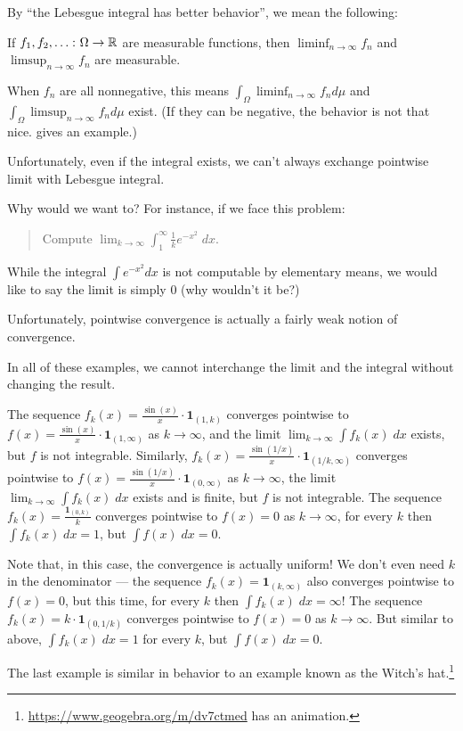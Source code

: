 By ``the Lebesgue integral has better behavior'', we mean the following:
\begin{proposition}
	If $f_1, f_2, \dots \colon \Omega \to \mathbb R$ are measurable functions,
	then $\liminf_{n \to \infty} f_n$ and $\limsup_{n \to \infty} f_n$ are measurable.
\end{proposition}
When $f_n$ are all nonnegative, this means
$\int_\Omega \liminf_{n \to \infty} f_n d\mu$ and $\int_\Omega \limsup_{n \to \infty} f_n d\mu$ exist.
(If they can be negative, the behavior is not that nice.  gives an example.)

Unfortunately, even if the integral exists, we can't always exchange pointwise limit with Lebesgue
integral.

Why would we want to? For instance, if we face this problem:
\begin{quote}
	Compute $\lim_{k \to \infty} \int_1^\infty \frac{1}{k} e^{-x^2} \; dx$.
\end{quote}
While the integral $\int e^{-x^2} dx$ is not computable by elementary means,
we would like to say the limit is simply $0$ (why wouldn't it be?)

Unfortunately, pointwise convergence is actually a fairly weak notion of convergence.

\begin{example}
	\label{ex:failure_interchange_lim_int}
	In all of these examples, we cannot interchange the limit and the integral
	without changing the result.
	\begin{itemize}
		\ii The sequence $f_k(x) = \frac{\sin(x)}{x} \cdot \mathbf{1}_{(1, k)}$ converges pointwise to
		$f(x) = \frac{\sin(x)}{x} \cdot \mathbf{1}_{(1, \infty)}$ as $k \to \infty$,
		and the limit $\lim_{k \to \infty} \int f_k(x) \; dx$ exists, but $f$ is not integrable.
		\ii Similarly, $f_k(x) = \frac{\sin(1/x)}{x} \cdot \mathbf{1}_{(1/k, \infty)}$
		converges pointwise to $f(x) = \frac{\sin(1/x)}{x} \cdot \mathbf{1}_{(0, \infty)}$
		as $k \to \infty$,
		the limit $\lim_{k \to \infty} \int f_k(x) \; dx$ exists and is finite,
		but $f$ is not integrable.
		\ii The sequence $f_k(x) = \frac{\mathbf{1}_{(0, k)}}{k}$ converges pointwise to $f(x)=0$ as $k
		\to \infty$, for every $k$ then $\int f_k(x) \; dx=1$, but $\int f(x) \; dx=0$.

		Note that, in this case, the convergence is actually uniform!
		\ii We don't even need $k$ in the denominator --- the sequence $f_k(x) = \mathbf{1}_{(k, \infty)}$ also
		converges pointwise to $f(x)=0$, but this time, for every $k$ then $\int f_k(x) \; dx=\infty$!
		\ii The sequence $f_k(x) = k \cdot \mathbf{1}_{(0, 1/k)}$ converges pointwise to $f(x)=0$ as $k
		\to \infty$. But similar to above, $\int f_k(x) \; dx=1$ for every $k$, but
		$\int f(x) \; dx=0$.
	\end{itemize}
	The last example is similar in behavior to an example known as the Witch's hat.\footnote{%
	\url{https://www.geogebra.org/m/dv7ctmed} has an animation.}
\end{example}

